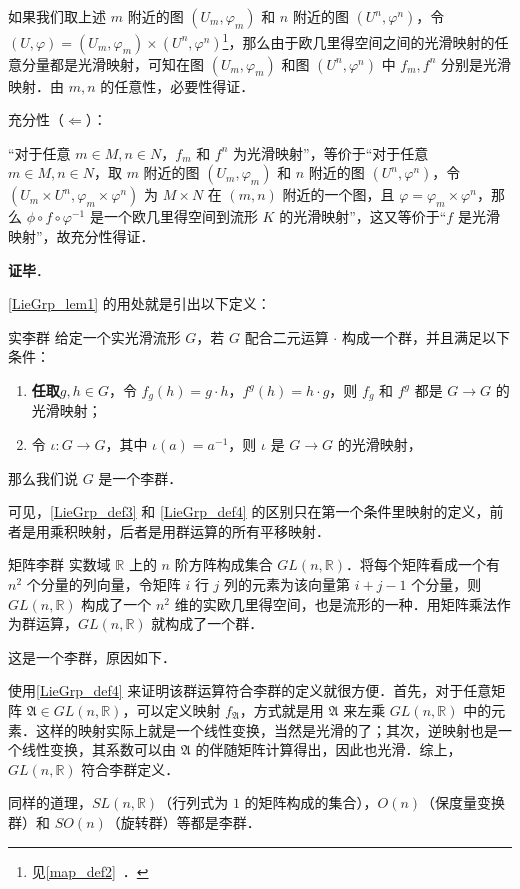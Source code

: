 如果我们取上述 $m$ 附近的图 $(U_m, \varphi_m)$ 和 $n$ 附近的图 $(U^n, \varphi^n)$，令 $(U, \varphi)=(U_m, \varphi_m)\times(U^n, \varphi^n)$\footnote{见\autoref{map_def2}~．}，那么由于欧几里得空间之间的光滑映射的任意分量都是光滑映射，可知在图 $(U_m, \varphi_m)$ 和图 $(U^n, \varphi^n)$ 中 $f_m, f^n$ 分别是光滑映射．由 $m, n$ 的任意性，必要性得证．

充分性（$\Leftarrow$）：

“对于任意 $m\in M, n\in N$，$f_m$ 和 $f^n$ 为光滑映射”，等价于“对于任意 $m\in M, n\in N$，取 $m$ 附近的图 $(U_m, \varphi_m)$ 和 $n$ 附近的图 $(U^n, \varphi^n)$，令 $(U_m\times U^n, \varphi_m\times\varphi^n)$ 为 $M\times N$ 在 $(m, n)$ 附近的一个图，且 $\varphi=\varphi_m\times\varphi^n$，那么 $\phi\circ f\circ\varphi^{-1}$ 是一个欧几里得空间到流形 $K$ 的光滑映射”，这又等价于“$f$ 是光滑映射”，故充分性得证．

\textbf{证毕}．

\autoref{LieGrp_lem1} 的用处就是引出以下定义：

\begin{definition}{实李群}\label{LieGrp_def4}
给定一个实光滑流形 $G$，若 $G$ 配合二元运算 $\cdot$ 构成一个群，并且满足以下条件：
\begin{enumerate}
\item \textbf{任取}$g, h\in G$，令 $f_g(h)=g\cdot h$，$f^g(h)=h\cdot g$，则 $f_g$ 和 $f^g$ 都是 $G\to G$ 的光滑映射；
\item 令 $\iota:G\to G$，其中 $\iota(a)=a^{-1}$，则 $\iota$ 是 $G\to G$ 的光滑映射，
\end{enumerate}
那么我们说 $G$ 是一个李群．
\end{definition}

可见，\autoref{LieGrp_def3} 和 \autoref{LieGrp_def4} 的区别只在第一个条件里映射的定义，前者是用乘积映射，后者是用群运算的所有平移映射．

\begin{example}{矩阵李群}\label{LieGrp_ex1}
实数域 $\mathbb{R}$ 上的 $n$ 阶方阵构成集合 $GL(n, \mathbb{R})$．将每个矩阵看成一个有 $n^2$ 个分量的列向量，令矩阵 $i$ 行 $j$ 列的元素为该向量第 $i+j-1$ 个分量，则 $GL(n, \mathbb{R})$ 构成了一个 $n^2$ 维的实欧几里得空间，也是流形的一种．用矩阵乘法作为群运算，$GL(n, \mathbb{R})$ 就构成了一个群．

这是一个李群，原因如下．

使用\autoref{LieGrp_def4} 来证明该群运算符合李群的定义就很方便．首先，对于任意矩阵 $\mathfrak{A}\in GL(n, \mathbb{R})$，可以定义映射 $f_\mathfrak{A}$，方式就是用 $\mathfrak{A}$ 来左乘 $GL(n, \mathbb{R})$ 中的元素．这样的映射实际上就是一个线性变换，当然是光滑的了；其次，逆映射也是一个线性变换，其系数可以由 $\mathfrak{A}$ 的伴随矩阵计算得出，因此也光滑．综上，$GL(n, \mathbb{R})$ 符合李群定义．

同样的道理，$SL(n, \mathbb{R})$（行列式为 $1$ 的矩阵构成的集合），$O(n)$（保度量变换群）和 $SO(n)$（旋转群）等都是李群．
\end{example}


